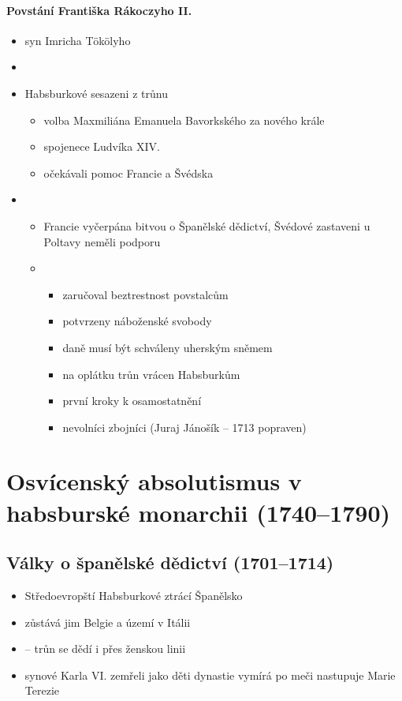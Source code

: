 \paragraph{Povstání Františka Rákoczyho II.}
\begin{itemize}
\item syn Imricha Tökölyho
\item {}
\item Habsburkové sesazeni z trůnu
	\begin{itemize}
	\item volba Maxmiliána Emanuela Bavorkského za nového krále
	\item spojenece Ludvíka XIV.
	\item očekávali pomoc Francie a Švédska
	\end{itemize}
\item {}
	\begin{itemize}
	\item Francie vyčerpána bitvou o Španělské dědictví, Švédové zastaveni u Poltavy \ra neměli podporu
	\item {}
		\begin{itemize}
		\item zaručoval beztrestnost povstalcům
		\item potvrzeny náboženské svobody
		\item daně musí být schváleny uherským sněmem
		\item na oplátku trůn vrácen Habsburkům
		\item první kroky k osamostatnění
		\item nevolníci \ra zbojníci (Juraj Jánošík -- 1713 popraven)
		\end{itemize}
	\end{itemize}
\end{itemize}


\section{Osvícenský absolutismus v habsburské monarchii (1740--1790)}
\subsection{Války o španělské dědictví (1701--1714)}
\begin{itemize}
\item Středoevropští Habsburkové ztrácí Španělsko
\item zůstává jim Belgie a území v Itálii
\item {} -- trůn se dědí i přes ženskou linii
\item synové Karla VI. zemřeli jako děti \ra dynastie vymírá po meči \ra nastupuje Marie Terezie
\end{itemize}

